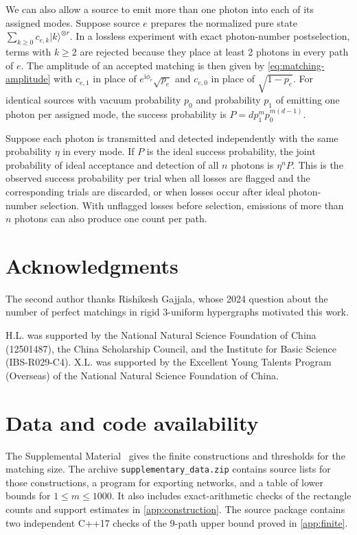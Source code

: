 \documentclass[10pt]{article}
\numberwithin{equation}{section}
\theoremstyle{definition}
\begin{document}
We can also allow a source to emit more than one photon into each of its assigned modes. Suppose source $e$ prepares the normalized pure state $\sum_{k\ge0}c_{e,k}|k\rangle^{\otimes r}$. In a lossless experiment with exact photon-number postselection, terms with $k\ge2$ are rejected because they place at least 2 photons in every path of $e$. The amplitude of an accepted matching is then given by \cref{eq:matching-amplitude} with $c_{e,1}$ in place of $e^{\mathrm{i}\phi_e}\sqrt{p_e}$ and $c_{e,0}$ in place of $\sqrt{1-p_e}$. For identical sources with vacuum probability $p_0$ and probability $p_1$ of emitting one photon per assigned mode, the success probability is $P=d p_1^m p_0^{m(d-1)}$.

Suppose each photon is transmitted and detected independently with the same probability $\eta$ in every mode. If $P$ is the ideal success probability, the joint probability of ideal acceptance and detection of all $n$ photons is $\eta^nP$. This is the observed success probability per trial when all losses are flagged and the corresponding trials are discarded, or when losses occur after ideal photon-number selection. With unflagged losses before selection, emissions of more than $n$ photons can also produce one count per path.

\section*{Acknowledgments}

The second author thanks Rishikesh Gajjala, whose 2024 question about the number of perfect matchings in rigid $3$-uniform hypergraphs motivated this work.

H.L. was supported by the National Natural Science Foundation of China (12501487), the China Scholarship Council, and the Institute for Basic Science (IBS-R029-C4). X.L. was supported by the Excellent Young Talents Program (Overseas) of the National Natural Science Foundation of China.

\section*{Data and code availability}

The Supplemental Material~\cite{LiLiuSupplement} gives the finite constructions and thresholds for the matching size. The archive \nolinkurl{supplementary_data.zip} contains source lists for those constructions, a program for exporting networks, and a table of lower bounds for $1\le m\le1000$. It also includes exact-arithmetic checks of the rectangle counts and support estimates in \cref{app:construction}. The source package contains two independent C++17 checks of the 9-path upper bound proved in \cref{app:finite}.
\end{document}
